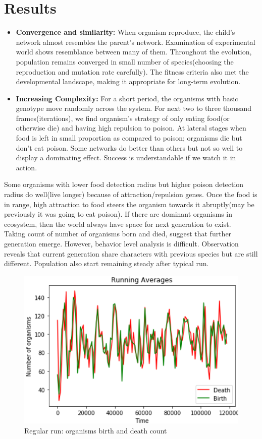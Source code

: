 \documentclass[conference]{IEEEtran}
\begin{document}
\section{Results}
\begin{itemize}
\item \textbf{Convergence and similarity:} When organism reproduce, the child's network almost resembles the parent's network. Examination of experimental world shows resemblance between many of them. Throughout the evolution, population remains converged in small number of species(choosing the reproduction and mutation rate carefully). The fitness criteria also met the developmental landscape, making it appropriate for long-term evolution.
\item \textbf{Increasing Complexity:} For a short period, the organisms with basic genotype move randomly across the system. For next two to three thousand frames(iterations), we find organism's strategy of only eating food(or otherwise die) and having high repulsion to poison. At lateral stages when food is left in small proportion as compared to poison; organisms die but don't eat poison. Some networks do better than others but not so well to display a dominating effect. Success is understandable if we watch it in action.
\end{itemize}
Some organisms with lower food detection radius but higher poison detection radius do well(live longer) because of attraction/repulsion genes. Once the food is in range, high attraction to food steers the organism towards it abruptly(may be previously it was going to eat poison). If there are dominant organisms in ecosystem, then the world always have space for next generation to exist.\\ Taking count of number of organisms born and died, suggest that further generation emerge. However, behavior level analysis is difficult. Observation reveals that current generation share characters with previous species but are still different. Population also start remaining steady after typical run.
\begin{figure}
	\includegraphics[scale=0.55]{birth-and-death.png}
	\caption{Regular run: organisms birth and death count}
	\label{fig:birth-and-death}
\end{figure}
\end{document}
